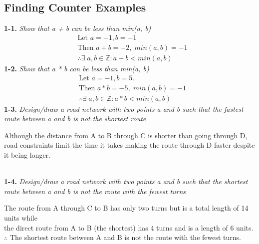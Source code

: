 \subsection*{Finding Counter Examples}

\textbf{1-1.} \emph{Show that a + b can be less than min(a, b)} 
{\color{answer}{}
\begin{align*}
  &\text{Let } a = -1, b = -1 \\
  &\text{Then } a + b = -2, \; min(a,b) = -1 \\
  &\therefore \exists \; a, b \in \mathbb{Z} : a+b < min(a,b) 
\end{align*}}
%
%
%
\textbf{1-2.} \emph{Show that a * b can be less than min(a, b)}
{\color{answer}{}
\begin{align*} 
	  &\text{Let } a = -1, b = 5. \\
	  &\text{Then } a*b = -5, \; min(a,b) = -1\\
	  &\therefore \exists \; a, b \in \mathbb{Z} : a*b < min(a,b)
\end{align*}}
%
%
%
\textbf{1-3.} \emph{Design/draw a road network with two points a and b such that the fastest route between a and b is not the shortest route}
{\color{answer}{}
\begin{center}
\end{center}
Although the distance from A to B through C is shorter than going through D, road constraints limit the time it takes making the route through D faster despite it being longer. } \\
%
%
%
\textbf{1-4.} \emph{Design/draw a road network with two points a and b such that the shortest route between a and b is not the route with the fewest turns} \\
{\color{answer}{}
\begin{center}
\end{center}
\begin{flushleft}
	The route from A through C to B has only two turns but is a total length of 14 units while \\
	the direct route from A to B (the shortest) has 4 turns and is a length of 6 units. \\
	$\therefore$ The shortest route between A and B is not the route with the fewest turns. \\
\end{flushleft}}
